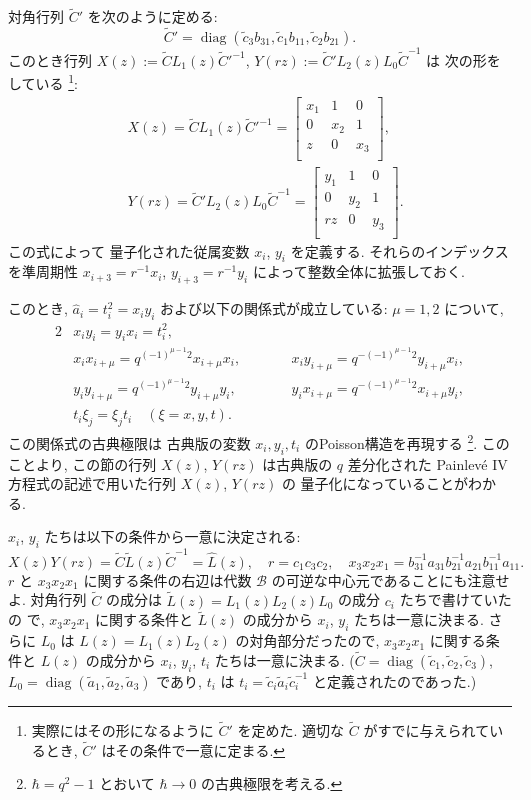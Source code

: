 \documentclass[12pt,twoside,dvipdfm]{msjproc}
\theoremstyle{definition} %
\theoremstyle{definition} %
\theoremstyle{definition} %
\numberwithin{theorem}{section}
\numberwithin{equation}{section}
\numberwithin{figure}{section}
\numberwithin{table}{section}
\newcommand\B{\mathcal{B}}
\newcommand\diag{\mathop{\mathrm{diag}}\nolimits}
\newcommand\tL{{\widetilde{L}}}
\newcommand\tC{{\widetilde{C}}}
\newcommand\ta{{\tilde{a}}}
\newcommand\tc{{\tilde{c}}}
\newcommand\hL{{\widehat{L}}}
\newcommand\ha{{\hat{a}}}
\begin{document}
対角行列 $\tC'$ を次のように定める:
\begin{equation*}
 \tC' = \diag(\tc_3 b_{31}, \tc_1 b_{11}, \tc_2 b_{21}).
\end{equation*}
このとき行列 $X(z):=\tC L_1(z) \tC'^{-1}$, $Y(rz):=\tC' L_2(z) L_0 \tC^{-1}$ は
次の形をしている%
\footnote{実際にはその形になるように $\tC'$ を定めた. 
適切な $\tC$ がすでに与えられているとき, $\tC'$ はその条件で一意に定まる.}:
\begin{align*}
 &
 X(z)=\tC L_1(z) \tC'^{-1} =
 \begin{bmatrix}
  x_1 & 1   & 0 \\
   0  & x_2 & 1 \\
   z  & 0   & x_3 \\
 \end{bmatrix},
 \\ &
 Y(rz)=\tC' L_2(z)L_0 \tC^{-1} =
 \begin{bmatrix}
  y_1 & 1   & 0  \\
   0  & y_2 & 1  \\
   rz & 0  & y_3 \\
 \end{bmatrix}.
\end{align*}
この式によって
量子化された従属変数 $x_i$, $y_i$ を定義する.
それらのインデックスを準周期性 $x_{i+3}=r^{-1}x_i$, $y_{i+3}=r^{-1}y_i$ 
によって整数全体に拡張しておく.

このとき, $\ha_i = t_i^2 = x_i y_i$ および以下の関係式が成立している: 
$\mu=1,2$ について, 
\begin{alignat*}{2}
 &
 x_i y_i = y_i x_i = t_i^2, \quad
 \\ &
 x_i x_{i+\mu} = q^{(-1)^{\mu-1}2} x_{i+\mu} x_i, \qquad
 & &
 x_i y_{i+\mu} = q^{-(-1)^{\mu-1}2} y_{i+\mu} x_i,
 \\ &
 y_i y_{i+\mu} = q^{(-1)^{\mu-1}2} y_{i+\mu} y_i, \qquad
 & &
 y_i x_{i+\mu} = q^{-(-1)^{\mu-1}2} x_{i+\mu} y_i,
 \\ &
 t_i \xi_j = \xi_j t_i \quad (\xi=x,y,t).
\end{alignat*}
この関係式の古典極限は
古典版の変数 $x_i,y_i,t_i$ のPoisson構造を再現する%
\footnote{$\hbar=q^2-1$ とおいて $\hbar\to 0$ の古典極限を考える.}.
このことより, この節の行列 $X(z)$, $Y(rz)$ は古典版の $q$ 差分化された
Painlev\'e IV 方程式の記述で用いた行列 $X(z)$, $Y(rz)$ の
量子化になっていることがわかる.


$x_i$, $y_i$ たちは以下の条件から一意に決定される:
\begin{equation*}
  X(z)Y(rz) = \tC \tL(z) \tC^{-1} = \hL(z), \quad
  r = c_1 c_3 c_2, \quad
  x_3 x_2 x_1 = b_{31}^{-1}a_{31}b_{21}^{-1}a_{21}b_{11}^{-1}a_{11}.
\end{equation*}
$r$ と $x_3 x_2 x_1$ に関する条件の右辺は代数 $\B$ の可逆な中心元であることにも注意せよ.
対角行列 $\tC$ の成分は $\tL(z)=L_1(z)L_2(z)L_0$ の成分 $c_i$ たちで書けていたの
で,  $x_3 x_2 x_1$ に関する条件と $\tL(z)$ の成分から $x_i$, $y_i$ たちは一意に決まる.
さらに $L_0$ は $L(z)=L_1(z)L_2(z)$ の対角部分だったので, 
$x_3 x_2 x_1$ に関する条件と $L(z)$ の成分から $x_i$, $y_i$, $t_i$ 
たちは一意に決まる. ($\tC=\diag(\tc_1,\tc_2,\tc_3)$, $L_0=\diag(\ta_1,\ta_2,\ta_3)$ であり, 
$t_i$ は $t_i=\tc_i\ta_i\tc_i^{-1}$ と定義されたのであった.) 
\end{document}
